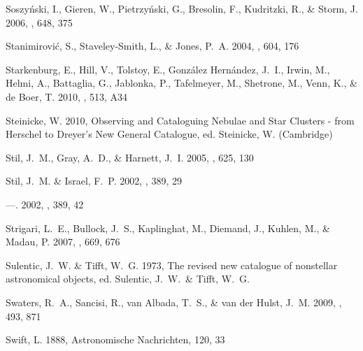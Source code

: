 \documentclass[manuscript]{aastex}
\begin{document}
\begin{thebibliography}{381}
{Soszy{\'n}ski}, I., {Gieren}, W., {Pietrzy{\'n}ski}, G., {Bresolin}, F.,
  {Kudritzki}, R., \& {Storm}, J. 2006, \apj, 648, 375

{Stanimirovi{\'c}}, S., {Staveley-Smith}, L., \& {Jones}, P.~A. 2004, \apj,
  604, 176

{Starkenburg}, E., {Hill}, V., {Tolstoy}, E., {Gonz{\'a}lez Hern{\'a}ndez},
  J.~I., {Irwin}, M., {Helmi}, A., {Battaglia}, G., {Jablonka}, P.,
  {Tafelmeyer}, M., {Shetrone}, M., {Venn}, K., \& {de Boer}, T. 2010, \aap,
  513, A34

{Steinicke}, W. 2010, {Observing and Cataloguing Nebulae and Star Clusters -
  from Herschel to Dreyer's New General Catalogue}, ed. {Steinicke, W.}
  (Cambridge)

{Stil}, J.~M., {Gray}, A.~D., \& {Harnett}, J.~I. 2005, \apj, 625, 130

{Stil}, J.~M. \& {Israel}, F.~P. 2002{}, \aap, 389, 29

---. 2002{}, \aap, 389, 42

{Strigari}, L.~E., {Bullock}, J.~S., {Kaplinghat}, M., {Diemand}, J., {Kuhlen},
  M., \& {Madau}, P. 2007, \apj, 669, 676

{Sulentic}, J.~W. \& {Tifft}, W.~G. 1973, {The revised new catalogue of
  nonstellar astronomical objects}, ed. {Sulentic, J.~W.~\& Tifft, W.~G.}

{Swaters}, R.~A., {Sancisi}, R., {van Albada}, T.~S., \& {van der Hulst}, J.~M.
  2009, \aap, 493, 871

{Swift}, L. 1888, Astronomische Nachrichten, 120, 33


\end{thebibliography}
\end{document}
